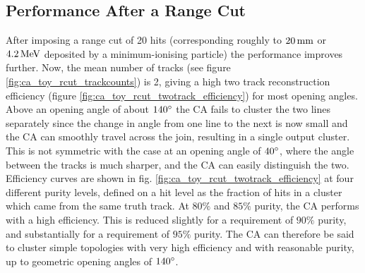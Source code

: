 
\subsection{Performance After a Range Cut}
After imposing a range cut of 20 hits (corresponding roughly to $20\,\mathrm{mm}$ or $4.2\,\mathrm{MeV}$ deposited by a minimum-ionising particle) the performance improves further. Now, the mean number of tracks (see figure \ref{fig:ca_toy_rcut_trackcounts}) is 2, giving a high two track reconstruction efficiency (figure \ref{fig:ca_toy_rcut_twotrack_efficiency}) for most opening angles. Above an opening angle of about $140^\circ$ the \ac{CA} fails to cluster the two lines separately since the change in angle from one line to the next is now small and the \ac{CA} can smoothly travel across the join, resulting in a single output cluster. This is not symmetric with the case at an opening angle of $40^\circ$, where the angle between the tracks is much sharper, and the \ac{CA} can easily distinguish the two. Efficiency curves are shown in fig. \ref{fig:ca_toy_rcut_twotrack_efficiency} at four different purity levels, defined on a hit level as the fraction of hits in a cluster which came from the same truth track. At $80\%$ and $85\%$ purity, the \ac{CA} performs with a high efficiency. This is reduced slightly for a requirement of $90\%$ purity, and substantially for a requirement of $95\%$ purity. The \ac{CA} can therefore be said to cluster simple topologies with very high efficiency and with reasonable purity, up to geometric opening angles of $140^\circ$.


